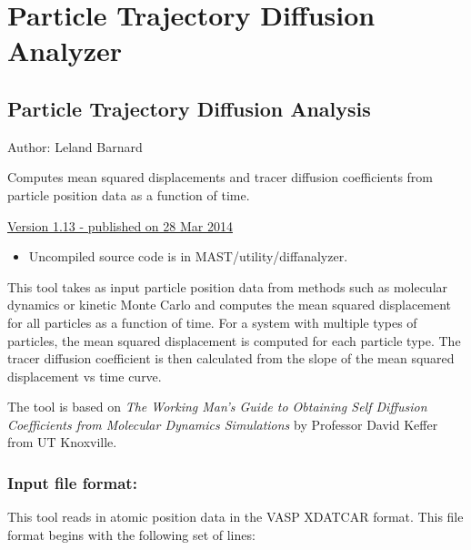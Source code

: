 \documentclass[letterpaper,10pt,english]{sphinxmanual}
\begin{document}
\section{Particle Trajectory Diffusion Analyzer}
\label{8_0_standalonetools:particle-trajectory-diffusion-analyzer}

\subsection{Particle Trajectory Diffusion Analysis}
\label{8_0_3_diffanalyzer:particle-trajectory-diffusion-analysis}\label{8_0_3_diffanalyzer::doc}
Author: Leland Barnard

Computes mean squared displacements and tracer diffusion coefficients from particle position data as a function of time.

\href{https://materialshub.org/resources/diffanalyzer}{Version 1.13 - published on 28 Mar 2014}
\begin{itemize}
\item {} 
Uncompiled source code is in MAST/utility/diffanalyzer.

\end{itemize}

This tool takes as input particle position data from methods such as molecular dynamics or kinetic Monte Carlo and computes the mean squared displacement for all particles as a function of time.
For a system with multiple types of particles, the mean squared displacement is computed for each particle type.
The tracer diffusion coefficient is then calculated from the slope of the mean squared displacement vs time curve.

The tool is based on \emph{The Working Man's Guide to Obtaining Self Diffusion Coefficients from Molecular Dynamics Simulations} by Professor David Keffer from UT Knoxville.


\subsubsection{Input file format:}
\label{8_0_3_diffanalyzer:input-file-format}
This tool reads in atomic position data in the VASP XDATCAR format. This file format begins with the following set of lines:
\end{document}
